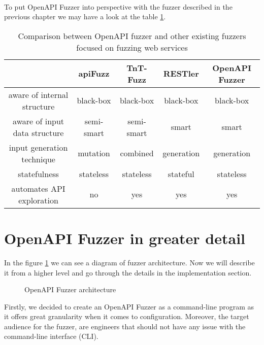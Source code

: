 \paragraph{}
To put OpenAPI Fuzzer into perspective with the fuzzer described in the previous chapter we may have a look at the table \ref{table:openapi-fuzzers-comparison}.

\begin{table}[h]
\begin{center}
\begin{tabular}{|c|c c c c|}
\hline
                              & apiFuzz    & TnT-Fuzz   & RESTler    & \textbf{OpenAPI Fuzzer} \\
\hline
aware of internal structure   & black-box  & black-box  & black-box  & black-box               \\
aware of input data structure & semi-smart & semi-smart & smart      & smart                   \\
input generation technique    & mutation   & combined   & generation & generation              \\
statefulness                 & stateless  & stateless  & stateful  & stateless                 \\
automates API exploration     & no         & yes        & yes        & yes                     \\
\hline
\end{tabular}
\caption{Comparison between OpenAPI fuzzer and other existing fuzzers focused on fuzzing web services}
\label{table:openapi-fuzzers-comparison}
\end{center}
\end{table}

\newpage
\section{OpenAPI Fuzzer in greater detail}
In the figure \ref{fig:fuzzer-architecture} we can see a diagram of fuzzer architecture. Now we will describe it from a higher level and go through the details in the implementation section.

\begin{figure}[h]
    \center
    \def\svgwidth{\columnwidth}
    \scalebox{0.7}{}
    \caption{OpenAPI Fuzzer architecture}
    \label{fig:fuzzer-architecture}
\end{figure}

Firstly, we decided to create an OpenAPI Fuzzer as a command-line program as it offers great granularity when it comes to configuration. Moreover, the target audience for the fuzzer, are engineers that should not have any issue with the command-line interface (CLI).

